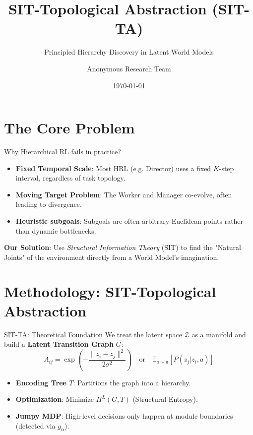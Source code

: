 \documentclass[10pt,aspectratio=169]{beamer}
\title{SIT-Topological Abstraction (SIT-TA)}
\subtitle{Principled Hierarchy Discovery in Latent World Models}
\date{\today}
\author{Anonymous Research Team}
\institute{Structural Information Science Lab}
\begin{document}
\maketitle

\section{The Core Problem}

\begin{frame}{Why Hierarchical RL fails in practice?}
  \begin{itemize}
    \item \textbf{Fixed Temporal Scale}: Most HRL (e.g. Director) uses a fixed $K$-step interval, regardless of task topology.
    \item \textbf{Moving Target Problem}: The Worker and Manager co-evolve, often leading to divergence.
    \item \textbf{Heuristic subgoals}: Subgoals are often arbitrary Euclidean points rather than dynamic bottlenecks.
  \end{itemize}
  \vfill
  \textbf{Our Solution}: Use \textit{Structural Information Theory} (SIT) to find the "Natural Joints" of the environment directly from a World Model's imagination.
\end{frame}

\section{Methodology: SIT-Topological Abstraction}

\begin{frame}{SIT-TA: Theoretical Foundation}
  We treat the latent space $\mathcal{Z}$ as a manifold and build a \textbf{Latent Transition Graph} $G$:
  \begin{equation}
    A_{ij} = \exp\left(-\frac{\|z_i - z_j\|^2}{2\sigma^2}\right) \quad \text{or} \quad \mathbb{E}_{a \sim \pi} [P(z_j | z_i, a)]
  \end{equation}
  \begin{itemize}
    \item \textbf{Encoding Tree $T$}: Partitions the graph into a hierarchy.
    \item \textbf{Optimization}: Minimize $H^L(G, T)$ (Structural Entropy).
    \item \textbf{Jumpy MDP}: High-level decisions only happen at module boundaries (detected via $g_\alpha$).
  \end{itemize}
\end{frame}
\end{document}
